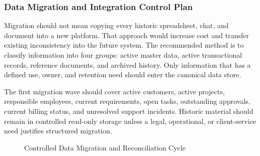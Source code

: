 \documentclass[12pt,a4paper]{report}
\begin{document}
\subsubsection{Data Migration and Integration Control Plan}
\label{sec:data-migration-plan}

Migration should not mean copying every historic spreadsheet, chat, and document into a new
platform. That approach would increase cost and transfer existing inconsistency into the future
system. The recommended method is to classify information into four groups: active master data,
active transactional records, reference documents, and archived history. Only information that has
a defined use, owner, and retention need should enter the canonical data store.

The first migration wave should cover active customers, active projects, responsible employees,
current requirements, open tasks, outstanding approvals, current billing status, and unresolved
support incidents. Historic material should remain in controlled read-only storage unless a legal,
operational, or client-service need justifies structured migration.

\begin{figure}[H]
\centering
{}
\caption{Controlled Data Migration and Reconciliation Cycle}
\label{fig:data-migration-cycle}
\end{figure}
\end{document}
